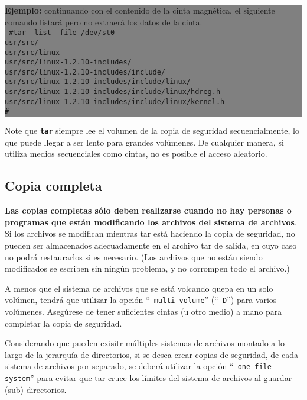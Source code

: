 \documentclass[12pt]{article}
\begin{document}
\colorbox{grey}{\parbox[t]{0.95\linewidth}{ \vspace*{0.5cm} { 
{\bf Ejemplo:} continuando con el contenido de la cinta magnética, el 
siguiente comando listará pero no extraerá los datos de la cinta.\\  
{\tt
\#tar --list --file /dev/st0\\
usr/src/\\
usr/src/linux\\
usr/src/linux-1.2.10-includes/\\
usr/src/linux-1.2.10-includes/include/\\
usr/src/linux-1.2.10-includes/include/linux/\\
usr/src/linux-1.2.10-includes/include/linux/hdreg.h\\
usr/src/linux-1.2.10-includes/include/linux/kernel.h\\
\#\\
}
} \vspace*{0.5cm} } } 

Note que \texttt{\textbf{tar}} siempre lee el volumen de la copia de 
seguridad secuencialmente, lo que puede llegar a ser lento para grandes 
volúmenes.  De cualquier manera, si utiliza medios secuenciales como 
cintas, no es posible el acceso aleatorio.

\subsection*{Copia completa}
{\bf Las copias completas sólo deben realizarse cuando no hay personas o 
programas que están modificando los archivos del sistema de archivos}. Si 
los archivos se modifican mientras tar está haciendo la copia de seguridad,
no pueden ser almacenados adecuadamente en el archivo tar de salida, en 
cuyo caso no podrá restaurarlos si es necesario. (Los archivos que  no 
están siendo modificados se escriben sin ningún problema, y no corrompen 
todo el archivo.)

A menos que el sistema de archivos que se está volcando quepa en un solo 
volúmen, tendrá que utilizar la opción ``{\tt --multi-volume}'' 
(``{\tt -D}'') para varios volúmenes.  Asegúrese de tener suficientes 
cintas (u otro medio) a mano para completar la copia de seguridad.

Considerando que pueden exisitr múltiples sistemas de archivos montado a lo
largo de la jerarquía de directorios, si se desea crear copias de seguridad,
de cada sistema de archivos por separado, se deberá utilizar la opción 
``{\tt --one-file-system}'' para evitar que tar cruce los límites
del sistema de archivos al guardar (sub) directorios.
\end{document}
